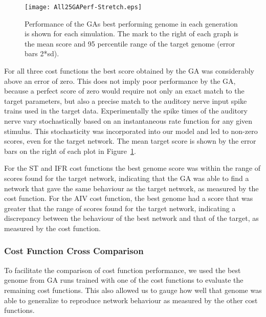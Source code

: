 \begin{figure}[t!]
  \centering
  \texttt{[image: All25GAPerf-Stretch.eps]}
  \caption{Performance of the GAs best performing genome in each
    generation is shown for each simulation. The mark to the right of
    each graph is the mean score and 95 percentile range of the target
    genome (error bars 2*sd).}\label{fig:R1}
\end{figure}

\medskip{}

For all three cost functions the best score obtained by the GA was considerably
above an error of zero. This does not imply poor performance by the GA, because
a perfect score of zero would require not only an exact match to the target
parameters, but also a precise match to the auditory nerve input spike trains
used in the target data. Experimentally the spike times of the auditory nerve
vary stochastically based on an instantaneous rate function for any given
stimulus. This stochasticity was incorporated into our model and led to non-zero
scores, even for the target network. The mean target score is shown by the error
bars on the right of each plot in Figure~\ref{fig:R1}.

\medskip{}

For the ST and IFR cost functions the best genome score was within the range of
scores found for the target network, indicating that the GA was able to find a
network that gave the same behaviour as the target network, as measured by the
cost function. For the AIV cost function, the best genome had a score that was
greater that the range of scores found for the target network, indicating a
discrepancy between the behaviour of the best network and that of the target, as
measured by the cost function.



\subsubsection{Cost Function Cross Comparison}

To facilitate the comparison of cost function performance, we used the best
genome from GA runs trained with one of the cost functions to evaluate the
remaining cost functions. This also allowed us to gauge how well that genome was
able to generalize to reproduce network behaviour as measured by the other cost
functions.


